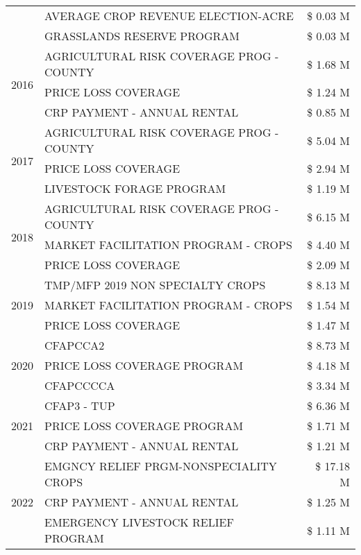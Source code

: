\begin{tabular}{llr}
 & AVERAGE CROP REVENUE ELECTION-ACRE & \$ 0.03 M \\
 & GRASSLANDS RESERVE PROGRAM & \$ 0.03 M \\
\cline{1-3}
\multirow[t]{3}{*}{2016} & AGRICULTURAL RISK COVERAGE PROG - COUNTY & \$ 1.68 M \\
 & PRICE LOSS COVERAGE & \$ 1.24 M \\
 & CRP PAYMENT - ANNUAL RENTAL & \$ 0.85 M \\
\cline{1-3}
\multirow[t]{3}{*}{2017} & AGRICULTURAL RISK COVERAGE PROG - COUNTY & \$ 5.04 M \\
 & PRICE LOSS COVERAGE & \$ 2.94 M \\
 & LIVESTOCK FORAGE PROGRAM & \$ 1.19 M \\
\cline{1-3}
\multirow[t]{3}{*}{2018} & AGRICULTURAL RISK COVERAGE PROG - COUNTY & \$ 6.15 M \\
 & MARKET FACILITATION PROGRAM - CROPS & \$ 4.40 M \\
 & PRICE LOSS COVERAGE & \$ 2.09 M \\
\cline{1-3}
\multirow[t]{3}{*}{2019} & TMP/MFP 2019 NON SPECIALTY CROPS & \$ 8.13 M \\
 & MARKET FACILITATION PROGRAM - CROPS & \$ 1.54 M \\
 & PRICE LOSS COVERAGE & \$ 1.47 M \\
\cline{1-3}
\multirow[t]{3}{*}{2020} & CFAPCCA2 & \$ 8.73 M \\
 & PRICE LOSS COVERAGE PROGRAM & \$ 4.18 M \\
 & CFAPCCCCA & \$ 3.34 M \\
\cline{1-3}
\multirow[t]{3}{*}{2021} & CFAP3 - TUP & \$ 6.36 M \\
 & PRICE LOSS COVERAGE PROGRAM & \$ 1.71 M \\
 & CRP PAYMENT - ANNUAL RENTAL & \$ 1.21 M \\
\cline{1-3}
\multirow[t]{3}{*}{2022} & EMGNCY RELIEF PRGM-NONSPECIALITY CROPS & \$ 17.18 M \\
 & CRP PAYMENT - ANNUAL RENTAL & \$ 1.25 M \\
 & EMERGENCY LIVESTOCK RELIEF PROGRAM & \$ 1.11 M \\
\cline{1-3}
\bottomrule
\end{tabular}
